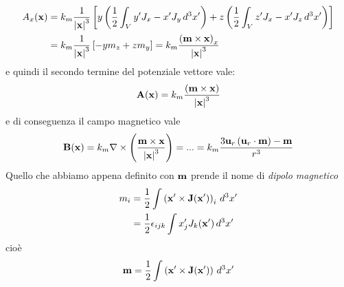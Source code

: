 \begin{align}
  A_x (\mathbf{ x }) &= k_m \frac{1}{\mathbf{ |x| }^3} \left[ y \left( \frac{1}{2} \int_V y'J_x - x'J_y \,d^3x' \right) 
  + z \left( \frac{1}{2} \int_V z'J_x - x'J_z \,d^3x' \right) \right]
  \\
  & = k_m \frac{1}{\mathbf{ |x| }^3} \left[ -ym_z + zm_y \right] = k_m \frac{\left( \mathbf{ m \times x } \right)_x}{\mathbf{ |x| }^3} 
\end{align}
e quindi il secondo termine del potenziale vettore vale:
\begin{equation} \label{eq:A_termine_dipolo}
  \mathbf{ A(x) } = k_m \frac{\left( \mathbf{ m \times x } \right)}{\mathbf{ |x| }^3} 
\end{equation}
e di conseguenza il campo magnetico vale
\begin{equation}
  \mathbf{ B(x) } = k_m \nabla \times \left( \frac{ \mathbf{ m \times x } }{\mathbf{ |x| }^3}  \right) = ... 
  = k_m \frac{3 \mathbf{ u }_r \left( \mathbf{ u }_r \cdot  \mathbf{ m } \right) - \mathbf{ m }}{r^3}
\end{equation}
Quello che abbiamo appena definito con $ \mathbf{m} $ prende il nome di \textit{dipolo magnetico}
\begin{align}
  m_i &= \frac{1}{2} \int \left( \mathbf{ x' \times J(x') } \right)_i \,d^3x'
  \\
  &= \frac{1}{2} \epsilon_{ijk}\int x'_jJ_k(\mathbf{ x' }) \,d^3x'
\end{align}
cioè 
\begin{align}
  \mathbf{m} = \frac{1}{2} \int \left( \mathbf{ x' \times J(x') } \right) \,d^3x'\\
\end{align}
